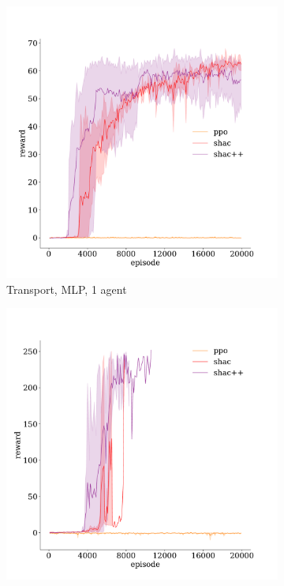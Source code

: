 \begin{figure}[!t]
    \begin{subfigure}[b]{0.32\textwidth}
        \includegraphics[width=\textwidth]{figs/transport-1-mlp.pdf}
        \caption{Transport, MLP, 1 agent}
        \label{fig:transport-mlp-1}
    \end{subfigure}
    \begin{subfigure}[b]{0.32\textwidth}
        \includegraphics[width=\textwidth]{figs/transport-3-transformer.pdf}

\end{subfigure}
\end{figure}
